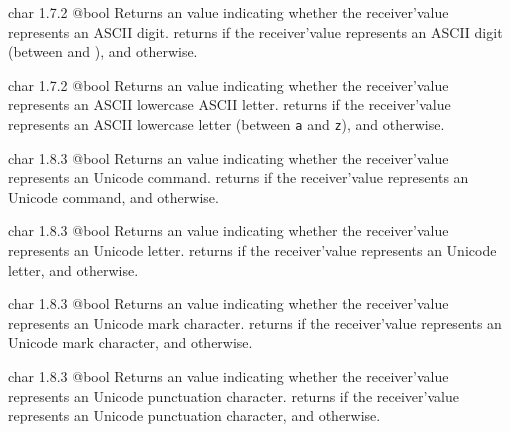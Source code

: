 {char}
{1.7.2}
{@bool}
{Returns an  value indicating whether the receiver'value represents an ASCII digit.}
{returns  if the receiver'value represents an ASCII digit (between \texttt{\textquotesingle} and \texttt{\textquotesingle}), and  otherwise.}





{char}
{1.7.2}
{@bool}
{Returns an  value indicating whether the receiver'value represents an ASCII lowercase ASCII letter.}
{returns  if the receiver'value represents an ASCII lowercase letter (between \texttt{\textquotesingle a\textquotesingle} and \texttt{\textquotesingle z\textquotesingle}), and  otherwise.}






{char}
{1.8.3}
{@bool}
{Returns an  value indicating whether the receiver'value represents an Unicode command.}
{returns  if the receiver'value represents an Unicode command, and  otherwise.}






{char}
{1.8.3}
{@bool}
{Returns an  value indicating whether the receiver'value represents an Unicode letter.}
{returns  if the receiver'value represents an Unicode letter, and  otherwise.}






{char}
{1.8.3}
{@bool}
{Returns an  value indicating whether the receiver'value represents an Unicode mark character.}
{returns  if the receiver'value represents an Unicode mark character, and  otherwise.}






{char}
{1.8.3}
{@bool}
{Returns an  value indicating whether the receiver'value represents an Unicode punctuation character.}
{returns  if the receiver'value represents an Unicode punctuation character, and  otherwise.}







